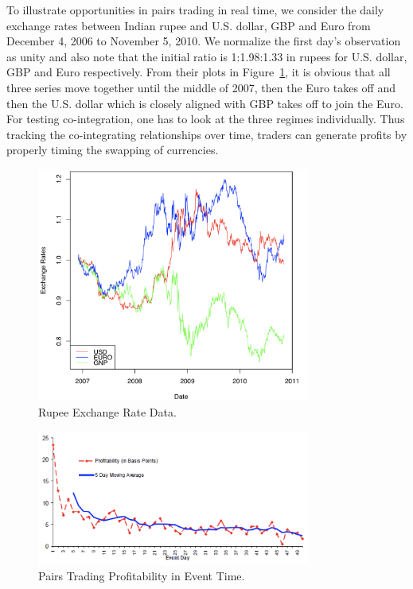 To illustrate opportunities in pairs trading in real time, we consider the daily exchange rates between Indian rupee and U.S. dollar, GBP and Euro from December 4, 2006 to November 5, 2010. We normalize the first day's observation as unity and also note that the initial ratio is 1:1.98:1.33 in rupees for U.S. dollar, GBP and Euro respectively. From their plots in Figure~\ref{fig:rupee}, it is obvious that all three series move together until the middle of 2007, then the Euro takes off and then the U.S. dollar which is closely aligned with GBP takes off to join the Euro. For testing co-integration, one has to look at the three regimes individually. Thus tracking the co-integrating relationships over time, traders can generate profits by properly timing the swapping of currencies.

	\begin{figure}[!ht]
	\centering
	\includegraphics[width=0.8\textwidth]{chapters/chapter_stat_ts/figures/473.png}
	\caption{Rupee Exchange Rate Data. \label{fig:rupee}}
	\end{figure}

	\begin{figure}[!ht]
	\centering
	\includegraphics[width=0.8\textwidth]{chapters/chapter_stat_ts/figures/Sec4-7Fig4.png}
	\caption{Pairs Trading Profitability in Event Time. \label{fig:pairsprofit}}
	\end{figure}


